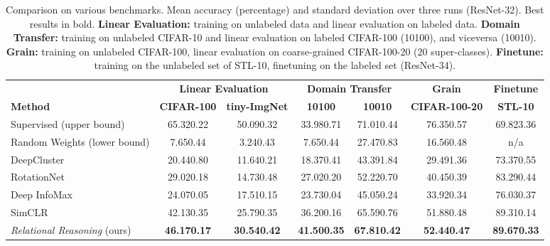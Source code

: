 \documentclass{article}
\begin{document}
\begin{table}[t!]
 \caption{Comparison on various benchmarks. Mean accuracy (percentage) and standard deviation over three runs (ResNet-32). Best results in bold. \textbf{Linear Evaluation:} training on unlabeled data and linear evaluation on labeled data. \textbf{Domain Transfer:} training on unlabeled CIFAR-10 and linear evaluation on labeled CIFAR-100 (10100), and viceversa (10010). \textbf{Grain:} training on unlabeled CIFAR-100, linear evaluation on coarse-grained CIFAR-100-20 (20 super-classes). \textbf{Finetune:} training on the unlabeled set of STL-10, finetuning on the labeled set (ResNet-34).}
 \label{tab:results}
 \begin{adjustbox}{width=\columnwidth,center}
  \centering
  \begin{tabular}{lcccccc}
    \toprule
     & \multicolumn{2}{c}{\textbf{Linear Evaluation}} & \multicolumn{2}{c}{\textbf{Domain Transfer}} &
     \multicolumn{1}{c}{\textbf{Grain}} &
     \multicolumn{1}{c}{\textbf{Finetune}}\\
    \cmidrule[0.1pt](r){2-3} \cmidrule[0.1pt](r){4-5} \cmidrule[0.1pt](l){6-6} \cmidrule[0.1pt](l){7-7}
    \textbf{Method} &
    \textbf{\small{CIFAR-100}} & \textbf{\small{tiny-ImgNet}} &
    \textbf{\small{10100}} & \textbf{\small{10010}} &
    \textbf{\small{CIFAR-100-20}} & \textbf{\small{STL-10}} \\
    \midrule
    Supervised (upper bound) & 
    65.32\small{0.22} & 50.09\small{0.32}  & 33.98\small{0.71} & 71.01\small{0.44} & 76.35\small{0.57} & 69.82\small{3.36} \\
    Random Weights (lower bound) & 
    7.65\small{0.44} & 3.24\small{0.43} & 7.65\small{0.44} & 27.47\small{0.83} & 16.56\small{0.48} & n/a \\
    \cmidrule(l){1-7}
    DeepCluster \citep{caron2018deep} & 
    20.44\small{0.80} & 11.64\small{0.21} & 18.37\small{0.41} & 43.39\small{1.84} & 29.49\small{1.36} & 73.37\small{0.55} \\
    RotationNet \citep{gidaris2018unsupervised} & 
    29.02\small{0.18} & 14.73\small{0.48} & 27.02\small{0.20} & 52.22\small{0.70} & 40.45\small{0.39} & 83.29\small{0.44} \\
    Deep InfoMax \citep{hjelm2018learning} & 
    24.07\small{0.05} & 17.51\small{0.15} & 23.73\small{0.04} & 45.05\small{0.24} & 33.92\small{0.34} & 76.03\small{0.37} \\
    SimCLR \citep{chen2020simple} & 
    42.13\small{0.35} & 25.79\small{0.35} & 36.20\small{0.16} & 65.59\small{0.76} & 51.88\small{0.48} & 89.31\small{0.14} \\  
    \emph{Relational Reasoning} (ours)  & \textbf{46.17\small{0.17}} & \textbf{30.54\small{0.42}} & \textbf{41.50\small{0.35}} & \textbf{67.81\small{0.42}} & \textbf{52.44\small{0.47}} & \textbf{89.67\small{0.33}} \\
    \bottomrule
  \end{tabular}
 \end{adjustbox}
\end{table}
\end{document}
